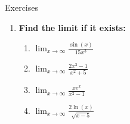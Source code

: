 \documentclass[../revisedmain.tex]{subfiles}
\begin{document}
	\begin{center}
		{\LARGE Exercises}
	\end{center}
	\begin{enumerate}
		\item\textbf{ Find the limit if it exists:}
		\begin{enumerate}
			\item $\lim_{x\to\infty}\frac{\sin(x)}{15x^3}$
			\item $\lim_{x\to\infty}\frac{2x^3-1}{x^2+5}$
			\item $\lim_{x\to\infty}\frac{xe^x}{x^2-1}$
			\item $\lim_{x\to\infty}\frac{2\ln(x)}{\sqrt{x-5}}$
		\end{enumerate}
	\end{enumerate}
\end{document}
